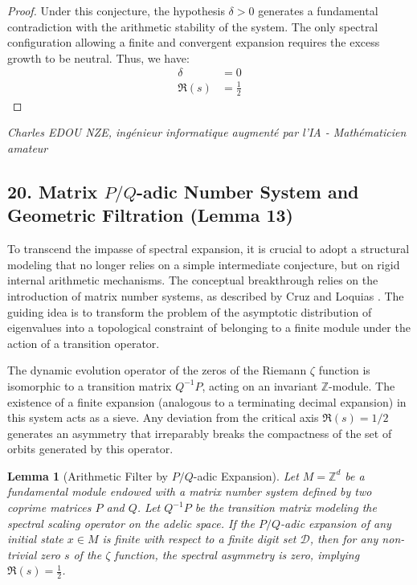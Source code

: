 \documentclass[
]{article}
\newtheorem{lemma}{Lemma}
\begin{document}
\begin{proof}
Under this conjecture, the hypothesis $\delta > 0$ generates a fundamental contradiction with the arithmetic stability of the system. The only spectral configuration allowing a finite and convergent expansion requires the excess growth to be neutral. Thus, we have:
\begin{align*}
    \delta &= 0 \\
    \Re(s) &= \frac{1}{2}
\end{align*}
\end{proof}

\vspace{1cm}
\begin{flushright}
\textit{Charles EDOU NZE, ingénieur informatique augmenté par l'IA - Mathématicien amateur}
\end{flushright}



\subsection{20. Matrix $P/Q$-adic Number System and Geometric Filtration (Lemma 13)}

To transcend the impasse of spectral expansion, it is crucial to adopt a structural modeling that no longer relies on a simple intermediate conjecture, but on rigid internal arithmetic mechanisms. The conceptual breakthrough relies on the introduction of matrix number systems, as described by Cruz and Loquias \cite{cruz2026}. The guiding idea is to transform the problem of the asymptotic distribution of eigenvalues into a topological constraint of belonging to a finite module under the action of a transition operator.

The dynamic evolution operator of the zeros of the Riemann $\zeta$ function is isomorphic to a transition matrix $Q^{-1}P$, acting on an invariant $\mathbb{Z}$-module. The existence of a finite expansion (analogous to a terminating decimal expansion) in this system acts as a sieve. Any deviation from the critical axis $\Re(s) = 1/2$ generates an asymmetry that irreparably breaks the compactness of the set of orbits generated by this operator.

\begin{lemma}[Arithmetic Filter by $P/Q$-adic Expansion]
    Let $M = \mathbb{Z}^d$ be a fundamental module endowed with a matrix number system defined by two coprime matrices $P$ and $Q$. Let $Q^{-1}P$ be the transition matrix modeling the spectral scaling operator on the adelic space.
    If the $P/Q$-adic expansion of any initial state $x \in M$ is finite with respect to a finite digit set $\mathcal{D}$, then for any non-trivial zero $s$ of the $\zeta$ function, the spectral asymmetry is zero, implying $\Re(s) = \frac{1}{2}$.
\end{lemma}
\end{document}
